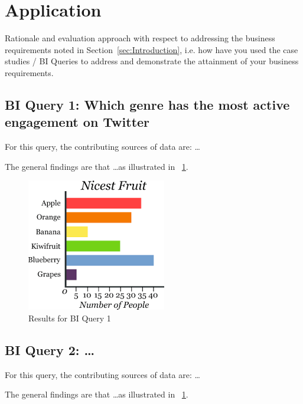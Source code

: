 \section{Application}
\label{sec:BIQueries}

Rationale and evaluation approach with respect to addressing the business requirements noted in Section~\ref{sec:Introduction}, i.e. how have you used the case studies / BI Queries to address and demonstrate the attainment of your business requirements.


\subsection{BI Query 1: Which genre has the most active engagement on Twitter}
\label{sec:BIOne}

For this query, the contributing sources of data are: \ldots

The general findings are that \ldots as illustrated in \figurename~\ref{fig:query1}.

\begin{figure}[ht]
\centering
\includegraphics[width=.5\textwidth]{./figures/query1}
\caption{Results for BI Query 1}
\label{fig:query1}
\end{figure}

\subsection{BI Query 2: \ldots}
\label{sec:BITwo}

For this query, the contributing sources of data are: \ldots

The general findings are that \ldots as illustrated in \figurename~\ref{fig:query1}.

